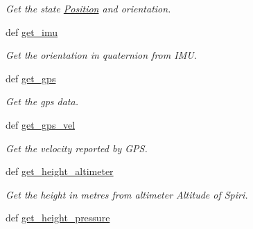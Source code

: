 \begin{DoxyCompactItemize}
\begin{DoxyCompactList}\small\item\em \-Get the state \hyperlink{classspiri__api_1_1api_1_1_position}{\-Position} and orientation. \end{DoxyCompactList}\item 
def \hyperlink{classspiri__api_1_1api_1_1spiri__api__python_a23787a36c6d9d4bae07d60fe2ca30185}{get\-\_\-imu}
\begin{DoxyCompactList}\small\item\em \-Get the orientation in quaternion from \-I\-M\-U. \end{DoxyCompactList}\item 
def \hyperlink{classspiri__api_1_1api_1_1spiri__api__python_a2f7b00bdd455b6b289e6a3324f4644f4}{get\-\_\-gps}
\begin{DoxyCompactList}\small\item\em \-Get the gps data. \end{DoxyCompactList}\item 
def \hyperlink{classspiri__api_1_1api_1_1spiri__api__python_a1941bbe037b37320191c6e81b0c3ff70}{get\-\_\-gps\-\_\-vel}
\begin{DoxyCompactList}\small\item\em \-Get the velocity reported by \-G\-P\-S. \end{DoxyCompactList}\item 
\hypertarget{classspiri__api_1_1api_1_1spiri__api__python_a5025edf4df072818a62ed352d74498b7}{def \hyperlink{classspiri__api_1_1api_1_1spiri__api__python_a5025edf4df072818a62ed352d74498b7}{get\-\_\-height\-\_\-altimeter}}\label{classspiri__api_1_1api_1_1spiri__api__python_a5025edf4df072818a62ed352d74498b7}

\begin{DoxyCompactList}\small\item\em \-Get the height in metres from altimeter \-Altitude of \-Spiri. \end{DoxyCompactList}\item 
\hypertarget{classspiri__api_1_1api_1_1spiri__api__python_a1fa3b9d619658b5cdd03cdc6a956c3f3}{def \hyperlink{classspiri__api_1_1api_1_1spiri__api__python_a1fa3b9d619658b5cdd03cdc6a956c3f3}{get\-\_\-height\-\_\-pressure}}\label{classspiri__api_1_1api_1_1spiri__api__python_a1fa3b9d619658b5cdd03cdc6a956c3f3}


\end{DoxyCompactItemize}
